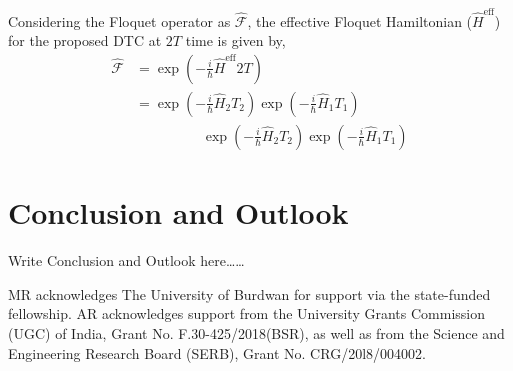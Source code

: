 \documentclass[%
reprint,
superscriptaddress,
amsmath,amssymb,
aps,
prb,
showkeys,
]{revtex4-2}
\begin{document}
Considering the Floquet operator as $\hat{\mathcal{F}}$, the effective Floquet Hamiltonian ($\hat{H}^{\mathrm{eff}}$) for the proposed DTC at $2T$ time is given by,
\begin{align}
    \hat{\mathcal{F}} &= \exp(- \frac{i}{\hbar} \hat{H}^{\mathrm{eff}} 2T)\nonumber\\
    & = \exp(-\frac{i}{\hbar}\hat{H}_2 T_2) \exp(-\frac{i}{\hbar}\hat{H}_1 T_1)\nonumber\\ 
	&\hspace{2cm} \exp(-\frac{i}{\hbar}\hat{H}_2 T_2) \exp(-\frac{i}{\hbar}\hat{H}_1 T_1)
\end{align}

\section{\label{sec:level7}Conclusion and Outlook}
Write Conclusion and Outlook here\dots\dots

\begin{acknowledgments}
MR acknowledges The University of Burdwan for support via the state-funded fellowship. AR acknowledges support from the University Grants Commission (UGC) of India, Grant No. F.30-425/2018(BSR), as well as from the Science and Engineering Research Board (SERB), Grant No. CRG/20l8/004002.
\end{acknowledgments}


\end{document}
